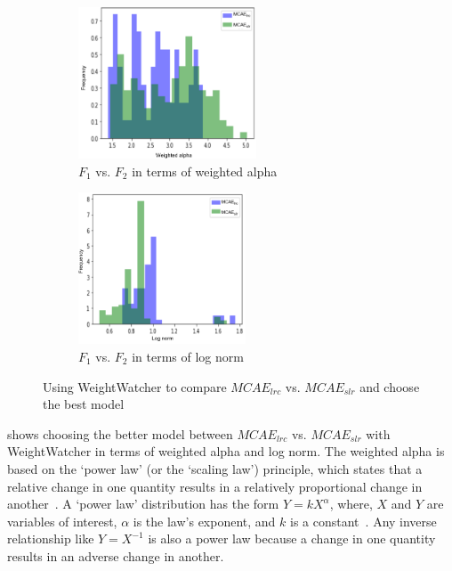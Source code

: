 \begin{figure}[h]
	\centering
	\begin{subfigure}{.48\linewidth}
		\centering
		\includegraphics[width=0.8\linewidth,height=45mm]{images/w1.png}
		\caption{$F_{1}$ vs. $F_{2}$ in terms of weighted alpha}
        \label{fig:ww1}
	\end{subfigure}
	\begin{subfigure}{0.48\linewidth}
		\centering
		\includegraphics[width=0.8\linewidth,height=45mm]{images/w2.png}
		\caption{$F_{1}$ vs. $F_{2}$ in terms of log norm}
        \label{fig:ww2}
	\end{subfigure}
	\caption{Using WeightWatcher to compare $MCAE_{lrc}$ vs. $MCAE_{slr}$ and choose the best model}
	\label{fig:weight_watch}
	\vspace{-2mm}
\end{figure}

\hspace*{3.5mm}  shows choosing the better model between $MCAE_{lrc}$ vs. $MCAE_{slr}$ with WeightWatcher in terms of weighted alpha and log norm. The weighted alpha is based on the `power law' (or the `scaling law') principle, which states that a relative change in one quantity results in a relatively proportional change in another~\cite{clauset2009power}. A `power law' distribution has the form $Y = kX^{\alpha}$, where, $X$ and $Y$ are variables of interest, $\alpha$ is the law's exponent, and $k$ is a constant~\cite{clauset2009power}. Any inverse relationship like $Y=X^{-1}$ is also a power law because a change in one quantity results in an adverse change in another.

